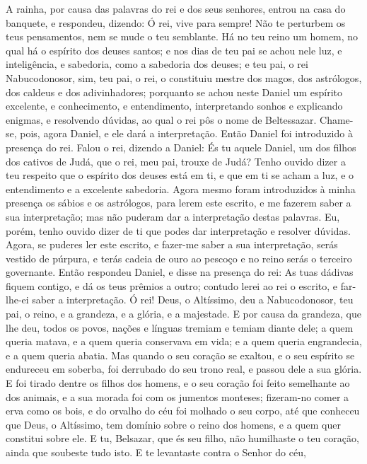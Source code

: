 A rainha, por causa das palavras do rei e dos seus senhores,
entrou na casa do banquete, e respondeu, dizendo: Ó rei, vive para
sempre! Não te perturbem os teus pensamentos, nem se mude o teu
semblante. Há no teu reino um homem, no qual há o espírito
dos deuses santos; e nos dias de teu pai se achou nele luz, e
inteligência, e sabedoria, como a sabedoria dos deuses; e teu pai, o
rei Nabucodonosor, sim, teu pai, o rei, o constituiu mestre dos
magos, dos astrólogos, dos caldeus e dos adivinhadores;
porquanto se achou neste Daniel um espírito excelente, e
conhecimento, e entendimento, interpretando sonhos e explicando
enigmas, e resolvendo dúvidas, ao qual o rei pôs o nome de
Beltessazar. Chame-se, pois, agora Daniel, e ele dará a
interpretação. Então Daniel foi introduzido à presença do
rei. Falou o rei, dizendo a Daniel: És tu aquele Daniel, um dos
filhos dos cativos de Judá, que o rei, meu pai, trouxe de Judá?
Tenho ouvido dizer a teu respeito que o espírito dos deuses
está em ti, e que em ti se acham a luz, e o entendimento e a
excelente sabedoria. Agora mesmo foram introduzidos à minha
presença os sábios e os astrólogos, para lerem este escrito, e me
fazerem saber a sua interpretação; mas não puderam dar a
interpretação destas palavras. Eu, porém, tenho ouvido dizer
de ti que podes dar interpretação e resolver dúvidas. Agora, se
puderes ler este escrito, e fazer-me saber a sua interpretação,
serás vestido de púrpura, e terás cadeia de ouro ao pescoço e no
reino serás o terceiro governante. Então respondeu Daniel, e
disse na presença do rei: As tuas dádivas fiquem contigo, e dá os
teus prêmios a outro; contudo lerei ao rei o escrito, e far-lhe-ei
saber a interpretação. Ó rei! Deus, o Altíssimo, deu a
Nabucodonosor, teu pai, o reino, e a grandeza, e a glória, e a
majestade. E por causa da grandeza, que lhe deu, todos os
povos, nações e línguas tremiam e temiam diante dele; a quem queria
matava, e a quem queria conservava em vida; e a quem queria
engrandecia, e a quem queria abatia. Mas quando o seu coração
se exaltou, e o seu espírito se endureceu em soberba, foi derrubado
do seu trono real, e passou dele a sua glória. E foi tirado
dentre os filhos dos homens, e o seu coração foi feito semelhante ao
dos animais, e a sua morada foi com os jumentos monteses; fizeram-no
comer a erva como os bois, e do orvalho do céu foi molhado o seu
corpo, até que conheceu que Deus, o Altíssimo, tem domínio sobre o
reino dos homens, e a quem quer constitui sobre ele. E tu,
Belsazar, que és seu filho, não humilhaste o teu coração, ainda que
soubeste tudo isto. E te levantaste contra o Senhor do céu,

